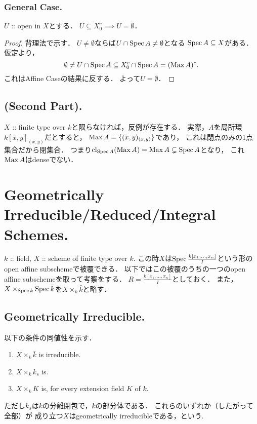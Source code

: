 \documentclass[a4paper]{jsarticle}
\begin{document}
    \subsubsection{General Case.}
    \begin{Claim}
        $U$ :: open in $X$とする．
        $U \subseteq X_0^c \implies U=\emptyset$．
    \end{Claim}
    \begin{proof}
        背理法で示す．
        $U \neq \emptyset$ならば$U \cap \operatorname{Spec} A \neq \emptyset$となる
        $\operatorname{Spec} A \subseteq X$がある．仮定より，
        \[ \emptyset \neq U \cap \operatorname{Spec} A \subseteq X_0^c \cap \operatorname{Spec} A=(\operatorname{Max} A)^c. \]
        これはAffine Caseの結果に反する．
        よって$U=\emptyset$．
    \end{proof}

    \subsection{(Second Part).}
    $X$ :: finite type over $k$と限らなければ，反例が存在する．
    実際，$A$を局所環$k[x,y]_{(x,y)}$だとすると，
    $\operatorname{Max} A=\{(x,y)_{(x,y)}\}$であり，
    これは閉点のみの1点集合だから閉集合．
    つまり$\operatorname{cl}_{\operatorname{Spec} A}(\operatorname{Max} A)=\operatorname{Max} A \subsetneq \operatorname{Spec} A$となり，
    これ$\operatorname{Max} A$はdenseでない．

\section{Geometrically Irreducible/Reduced/Integral Schemes.} %
    $k$ :: field, $X$ :: scheme of finite type over $k$.
    この時$X$は$\operatorname{Spec} \frac{k[x_1,\dots,x_n]}{I}$という形のopen affine subschemeで被覆できる．
    以下ではこの被覆のうちの一つのopen affine subschemeを取って考察をする．
    $R=\frac{k[x_1,\dots,x_n]}{I}$としておく．
    また，$X \times_{\operatorname{Spec} k} \operatorname{Spec} \bar{k}$を$X \times_k \bar{k}$と略す．

    \subsection{Geometrically Irreducible.}
    以下の条件の同値性を示す．
    \begin{enumerate}[label=(\roman*)]
        \item $X \times_k \bar{k}$ is irreducible.
        \item $X \times_k k_s$ is.
        \item $X \times_k K$ is, for every extension field $K$ of $k$.
    \end{enumerate}
    ただし$k_s$は$k$の分離閉包で，$\bar{k}$の部分体である．
    これらのいずれか（したがって全部）が
    成り立つ$X$はgeometrically irreducibleである，という.
\end{document}
